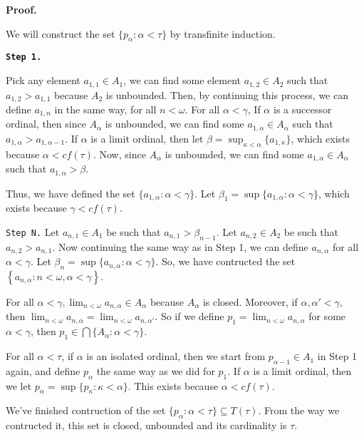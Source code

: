 \documentclass{article}
\begin{document}
\vskip 15pt
\textbf{Proof.} 

We will construct the set $\{p_\alpha: \alpha<\tau\}$ by transfinite induction.

\vskip 10pt
\texttt{\textbf{Step 1.}}

Pick any element $a_{1,1}\in A_1$, we can find some element $a_{1,2}\in A_2$ such that $a_{1,2}>a_{1,1}$ because $A_2$ is unbounded. Then, 
by continuing this process, we can define $a_{1,n}$ in the same way, for all $n<\omega$. 
For all $\alpha<\gamma$,
If $\alpha$ is a successor ordinal, then since $A_\alpha$ is unbounded, we can find some $a_{1,\alpha} \in A_\alpha$ such that $a_{1,\alpha}>a_{1,\alpha-1}$. If $\alpha$ is a limit ordinal, then let $\beta=\sup_{\kappa<\alpha} \{a_{1,\kappa}\}$, which exists because $\alpha<cf(\tau)$. Now, since $A_\alpha$ is unbounded, we can find some $a_{1,\alpha}\in A_\alpha$ such that $a_{1,\alpha} >  \beta$.

Thus, we have defined the set $\{a_{1,\alpha}: \alpha <\gamma\}$. Let $\beta_1=\sup\{a_{1,\alpha}: \alpha <\gamma\}$, which exists because $\gamma<cf(\tau)$. 

\vskip 10pt

\texttt{Step N.}
Let $a_{n,1}\in A_1$ be such that $a_{n,1} > \beta_{n-1}$. Let $a_{n,2}\in A_2$ be such that $a_{n,2} > a_{n,1}$. Now continuing the same way as in Step 1, we can define $a_{n,\alpha}$ for all $\alpha<\gamma$. Let $\beta_n=\sup\{a_{n,\alpha}: \alpha <\gamma\}$. 
\vskip 10pt
So, we have contructed the set $\left\{a_{n,\alpha}: n<\omega, \alpha<\gamma\right\}$.

\vskip 10pt

For all $\alpha<\gamma, \lim_{n<\omega} a_{n,\alpha} \in A_\alpha$ because $A_\alpha$ is closed. Moreover, if $\alpha,\alpha' <\gamma$, then $\lim_{n<\omega} a_{n,\alpha}= \lim_{n<\omega} a_{n,\alpha'}$. So if we define $p_1=\lim_{n<\omega} a_{n,\alpha}$ for some $\alpha<\gamma$, then $p_1\in \bigcap \{A_\alpha: \alpha<\gamma\}$. 
\vskip 10pt


For all $\alpha <\tau$, if $\alpha$ is an isolated ordinal, then we start from $p_{\alpha-1}\in A_1$ in Step 1 again, and define $p_\alpha$ the same way as we did for $p_1$. 
If $\alpha$ is a limit ordinal, then we let $p_\alpha= \sup \{p_\kappa: \kappa<\alpha\}$. This exists because $\alpha<cf(\tau)$. 

\vskip 10pt

We've finished contruction of the set $\{p_\alpha: \alpha<\tau\}\subseteq T(\tau)$.  From the way we contructed it, this set is closed, unbounded and its cardinality is $\tau$.
\end{document}
